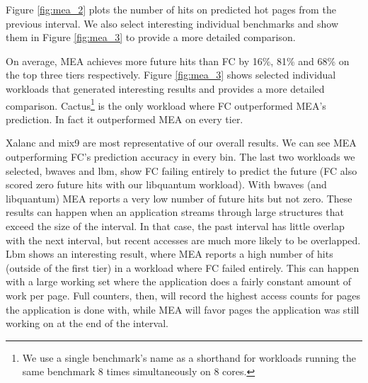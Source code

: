 Figure \ref{fig:mea_2} plots the number of hits on predicted hot pages from the previous interval. We also select interesting individual benchmarks and show them in Figure \ref{fig:mea_3} to provide a more detailed comparison. 


On average, MEA achieves more future hits than FC by 16\%, 81\% and 68\% on the top three tiers respectively. Figure \ref{fig:mea_3} shows selected individual workloads that generated interesting results and provides a more detailed comparison. Cactus\footnote{We use a single benchmark's name as a shorthand for workloads running the same benchmark 8 times simultaneously on 8 cores.} is the only workload where FC outperformed MEA's prediction. In fact it outperformed MEA on every tier. 

Xalanc and mix9 are most representative of our overall
results. We can see MEA outperforming FC's prediction accuracy in every bin. 
The last two workloads we selected, bwaves and lbm, show FC failing entirely to predict the future (FC also scored zero future hits with our libquantum workload). With bwaves (and libquantum) MEA reports a very low number of future hits but not zero. These results can happen when an application streams through large structures
that exceed the size of the interval.  In that case, the past interval has 
little overlap with the next interval, but recent accesses are much more
likely to be overlapped.
Lbm shows an interesting result, where MEA reports 
a high number of hits (outside of the first tier) in a workload where 
FC failed entirely.  This can happen with a large working set where the 
application does a fairly constant amount of work per page.  Full counters,
then, will record the highest access counts for pages the application is done
with, while MEA will favor pages the application was still working on at the
end of the interval.


